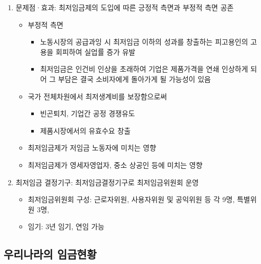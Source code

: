 \documentclass[aspectratio=169,xcolor=dvipsnames,handout]{beamer}
\begin{document}
\begin{frame}[allowframebreaks]
\begin{enumerate}[<+->]
        \framebreak%
        \item 문제점·효과: 최저임금제의 도입에 따른 긍정적 측면과 부정적 측면 공존
        \begin{itemize}[<+->]
            \item 부정적 측면
            \begin{itemize}[<+->]
                \item 노동시장의 공급과잉 시 최저임금 이하의 성과를 창출하는 피고용인의 고용을 회피하여 실업률 증가 유발
                \item 최저임금은 인건비 인상을 초래하여 기업은 제품가격을 연쇄 인상하게 되어 그 부담은 결국 소비자에게 돌아가게 될 가능성이 있음
            \end{itemize}
            \item 국가 전체차원에서 최저생계비를 보장함으로써
            \begin{itemize}[<+->]
                \item 빈곤퇴치, 기업간 공정 경쟁유도
                \item 제품시장에서의 유효수요 창출
            \end{itemize}
            \item 최저임금제가 저임금 노동자에 미치는 영향
            \item 최저임금제가 영세자영업자, 중소 상공인 등에 미치는 영향
        \end{itemize}
        \item 최저임금 결정기구: 최저임금결정기구로 최저임금위원회 운영
        \begin{itemize}[<+->]
            \item 최저임금위원회 구성: 근로자위원, 사용자위원 및 공익위원 등 각 9명, 특별위원 3명,
            \item 임기: 3년 임기, 연임 가능
        \end{itemize}
    \end{enumerate}
\end{frame}

\subsection{우리나라의 임금현황}%
\end{document}
